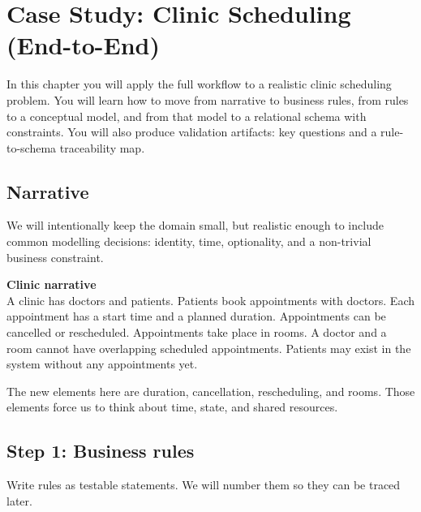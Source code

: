 \chapter{Case Study: Clinic Scheduling (End-to-End)}

\begin{learningobjectives}
In this chapter you will apply the full workflow to a realistic clinic scheduling problem.
You will learn how to move from narrative to business rules, from rules to a conceptual model, and from that model to a relational schema with constraints.
You will also produce validation artifacts: key questions and a rule-to-schema traceability map.
\end{learningobjectives}

\section{Narrative}
We will intentionally keep the domain small, but realistic enough to include common modelling decisions:
identity, time, optionality, and a non-trivial business constraint.

\begin{examplebox}
\textbf{Clinic narrative}\\
A clinic has doctors and patients.
Patients book appointments with doctors.
Each appointment has a start time and a planned duration.
Appointments can be cancelled or rescheduled.
Appointments take place in rooms.
A doctor and a room cannot have overlapping scheduled appointments.
Patients may exist in the system without any appointments yet.
\end{examplebox}

The new elements here are duration, cancellation, rescheduling, and rooms.
Those elements force us to think about time, state, and shared resources.

\section{Step 1: Business rules}
Write rules as testable statements.
We will number them so they can be traced later.

